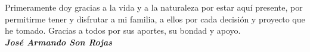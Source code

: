 \dedicatory

Primeramente doy gracias a la vida y a la naturaleza por estar aquí presente, por permitirme tener y disfrutar a mi familia, a ellos por cada decisión y proyecto que he tomado. Gracias a todos por sus aportes, su bondad y apoyo.%
\\
\textbf{\emph{José Armando Son Rojas}}
\enddedicatory
